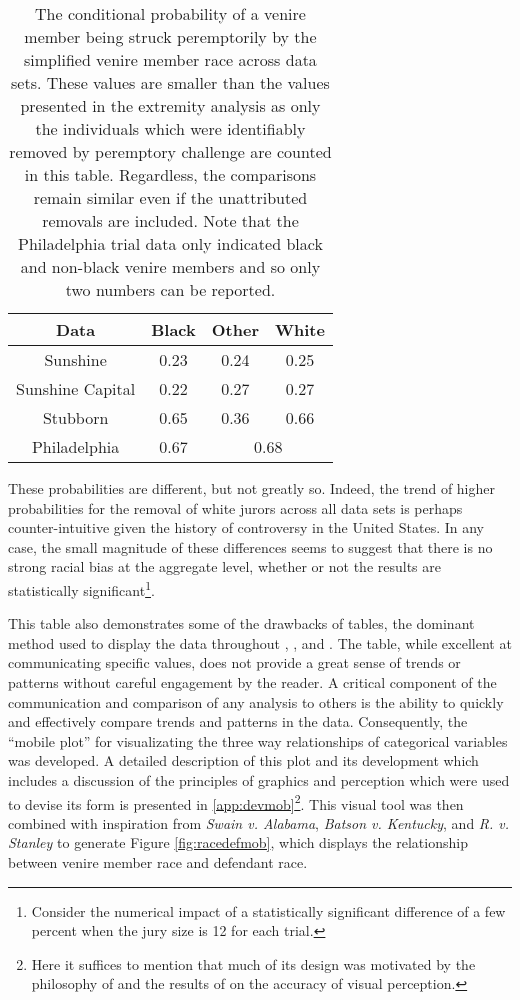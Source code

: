 \begin{table}[h!]
  \centering
  \caption[Strike Rate by Race]{\footnotesize The conditional probability of a venire member being struck peremptorily by the
    simplified venire member race across data sets. These values are smaller than the values presented in the extremity analysis
    as only the individuals which were identifiably removed by peremptory challenge are counted in this table. Regardless, the
    comparisons remain similar even if the unattributed removals are included. Note that the Philadelphia trial data only
    indicated black and non-black venire members and so only two numbers can be reported.} \label{tab:margrace}
  \begin{tabular}{|c|c c c|} \hline
    Data & Black & Other & White \\ \hline
    Sunshine & 0.23 & 0.24 & 0.25 \\
    Sunshine Capital & 0.22 & 0.27 & 0.27 \\
    Stubborn & 0.65 & 0.36 & 0.66 \\ 
    Philadelphia & 0.67 & \multicolumn{2}{c|}{0.68} \\ \hline
  \end{tabular}
\end{table}

These probabilities are different, but not greatly so. Indeed, the trend of higher probabilities for the removal of white jurors
across all data sets is perhaps counter-intuitive given the history of controversy in the United States. In any case, the small
magnitude of these differences seems to suggest that there is no strong racial bias at the aggregate level, whether or not the
results are statistically significant\footnote{Consider the numerical impact of a statistically significant difference of a few
  percent when the jury size is 12 for each trial.}.

This table also demonstrates some of the drawbacks of tables, the dominant method used to display the data throughout
\cite{JurySunshineProj}, \cite{StubbornLegacy}, and \cite{PerempChalMurder}. The table, while excellent at communicating specific
values, does not provide a great sense of trends or patterns without careful engagement by the reader. A critical component of the
communication and comparison of any analysis to others is the ability to quickly and effectively compare trends and patterns in
the data. Consequently, the ``mobile plot'' for visualizating the three way relationships of categorical variables was
developed. A detailed description of this plot and its development which includes a discussion of the principles of graphics and
perception which were used to devise its form is presented in \ref{app:devmob}\footnote{Here it suffices to mention that much of
  its design was motivated by the philosophy of \cite{VisualDisplayQuant} and the results of \cite{cleveland1987} on the accuracy
  of visual perception.}. This visual tool was then combined with inspiration from \textit{Swain v. Alabama}, \textit{Batson
  v. Kentucky}, and \textit{R. v. Stanley} to generate Figure \ref{fig:racedefmob}, which displays the relationship between venire member
race and defendant race.

